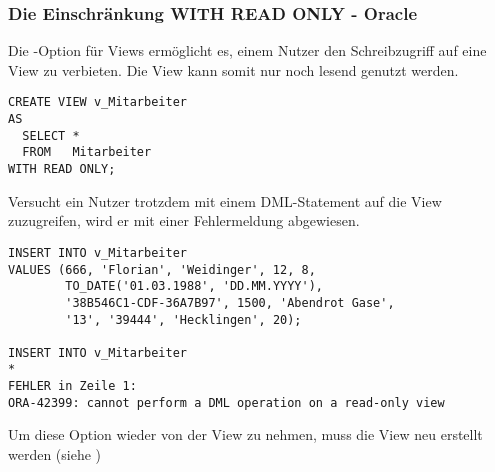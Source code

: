         \subsubsection{Die Einschränkung WITH READ ONLY - Oracle}
          \label{READONLY}
          Die -Option für Views ermöglicht es, einem Nutzer den Schreibzugriff auf eine View zu verbieten. Die View kann somit nur noch lesend genutzt werden.
          \begin{lstlisting}[language=oracle_sql,caption={Eine View mit mit READ ONLY Option erstellen},label=sql08_38]
CREATE VIEW v_Mitarbeiter
AS
  SELECT *
  FROM   Mitarbeiter
WITH READ ONLY;
          \end{lstlisting}
          Versucht ein Nutzer trotzdem mit einem DML-Statement auf die View zuzugreifen, wird er mit einer Fehlermeldung abgewiesen.
\clearpage
          \begin{lstlisting}[language=oracle_sql,caption={Daten in eine READ ONLY View einfügen schlägt fehl},label=sql08_39]
INSERT INTO v_Mitarbeiter
VALUES (666, 'Florian', 'Weidinger', 12, 8,
        TO_DATE('01.03.1988', 'DD.MM.YYYY'),
        '38B546C1-CDF-36A7B97', 1500, 'Abendrot Gase',
        '13', '39444', 'Hecklingen', 20);

INSERT INTO v_Mitarbeiter
*
FEHLER in Zeile 1:
ORA-42399: cannot perform a DML operation on a read-only view
          \end{lstlisting}
          Um diese Option wieder von der View zu nehmen, muss die View neu erstellt werden (siehe )
